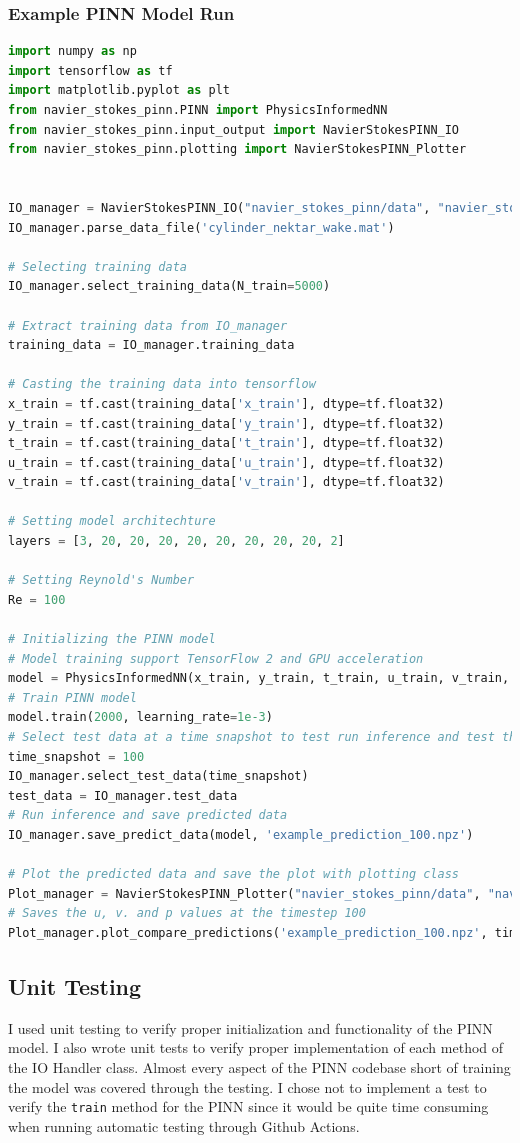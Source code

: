 \subsubsection{Example PINN Model Run}
\begin{lstlisting}[language = Python]
import numpy as np
import tensorflow as tf
import matplotlib.pyplot as plt
from navier_stokes_pinn.PINN import PhysicsInformedNN
from navier_stokes_pinn.input_output import NavierStokesPINN_IO
from navier_stokes_pinn.plotting import NavierStokesPINN_Plotter


IO_manager = NavierStokesPINN_IO("navier_stokes_pinn/data", "navier_stokes_pinn/output")
IO_manager.parse_data_file('cylinder_nektar_wake.mat')

# Selecting training data
IO_manager.select_training_data(N_train=5000)

# Extract training data from IO_manager
training_data = IO_manager.training_data

# Casting the training data into tensorflow
x_train = tf.cast(training_data['x_train'], dtype=tf.float32)
y_train = tf.cast(training_data['y_train'], dtype=tf.float32)
t_train = tf.cast(training_data['t_train'], dtype=tf.float32)
u_train = tf.cast(training_data['u_train'], dtype=tf.float32)
v_train = tf.cast(training_data['v_train'], dtype=tf.float32)

# Setting model architechture
layers = [3, 20, 20, 20, 20, 20, 20, 20, 20, 2]

# Setting Reynold's Number
Re = 100

# Initializing the PINN model
# Model training support TensorFlow 2 and GPU acceleration
model = PhysicsInformedNN(x_train, y_train, t_train, u_train, v_train, Re, layers)
# Train PINN model
model.train(2000, learning_rate=1e-3)
# Select test data at a time snapshot to test run inference and test the trained model
time_snapshot = 100
IO_manager.select_test_data(time_snapshot)
test_data = IO_manager.test_data
# Run inference and save predicted data
IO_manager.save_predict_data(model, 'example_prediction_100.npz')

# Plot the predicted data and save the plot with plotting class
Plot_manager = NavierStokesPINN_Plotter("navier_stokes_pinn/data", "navier_stokes_pinn/plots", IO_manager)
# Saves the u, v. and p values at the timestep 100
Plot_manager.plot_compare_predictions('example_prediction_100.npz', time_snapshot)
\end{lstlisting}

\subsection{Unit Testing}
I used unit testing to verify proper initialization and functionality of the PINN model. I also wrote unit tests to verify proper implementation of each method of the IO Handler class. Almost every aspect of the PINN codebase short of training the model was covered through the testing. I chose not to implement a test to verify the \texttt{train} method for the PINN since it would be quite time consuming when running automatic testing through Github Actions.

